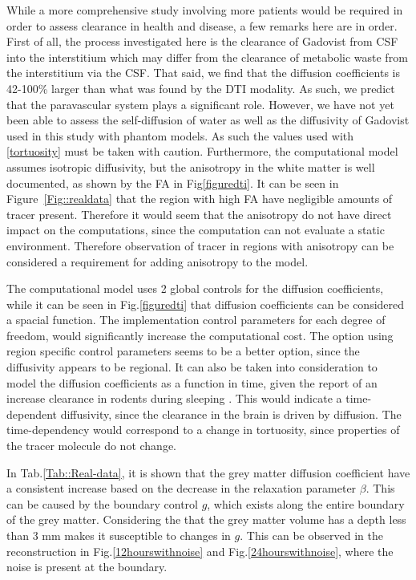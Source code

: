 \documentclass[11pt,a4paper]{article}
\begin{document}
While a more comprehensive study involving more patients would be required in order to assess clearance in health and disease, a few remarks here are in order. 
First of all, the process investigated here is the clearance of Gadovist from CSF into the interstitium which may differ from the clearance of metabolic waste 
from the interstitium via the CSF. That said, 
we find that the diffusion coefficients is 42-100\% larger than what was found by the DTI modality. As such, we predict that the paravascular system 
plays a significant role.  
However, we have not yet been able to assess the self-diffusion of water as well as the diffusivity of Gadovist used in this study with phantom models. As such 
the values used with \eqref{tortuosity} must be taken with caution. Furthermore,    
the computational model assumes isotropic diffusivity, but the anisotropy in the white matter is well documented, as shown by the FA in Fig\ref{figuredti}. It can be seen in Figure~\ref{Fig::realdata} that the region with high FA have negligible amounts of tracer present. Therefore it would seem that the anisotropy do not have direct impact on the computations, since the computation can not evaluate a static environment. Therefore  observation of tracer in regions with anisotropy can be considered a requirement for adding anisotropy to the model.

The computational model uses 2 global controls for the diffusion coefficients, while it can be seen in  Fig.\ref{figuredti} that diffusion coefficients can be considered a spacial function. The implementation control parameters for each degree of freedom, would significantly increase the computational cost. The option using region specific control parameters seems to be a better option, since the diffusivity appears to be regional. It can also be taken into consideration to model the diffusion coefficients as a function in time, given the report of an increase clearance in rodents during sleeping \cite{xie2013sleep}. This would indicate a time-dependent diffusivity, since the clearance in the brain is driven by diffusion. The time-dependency would correspond to a change in tortuosity, since properties of the tracer molecule do not change.

In Tab.\ref{Tab::Real-data}, it is shown that the grey matter diffusion coefficient have a consistent increase based on the decrease in the relaxation parameter $\beta$. This can be caused by the boundary control $g$, which exists along the entire boundary of the grey matter. Considering the that the grey matter volume has a depth less than 3 mm makes it susceptible to changes in $g$. This can be observed in the reconstruction in Fig.\ref{12hourswithnoise} and Fig.\ref{24hourswithnoise}, where the noise is present at the boundary.
  
\end{document}
